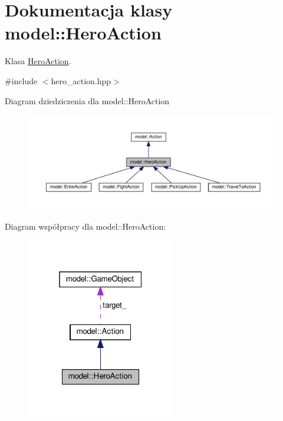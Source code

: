 \hypertarget{classmodel_1_1HeroAction}{}\section{Dokumentacja klasy model\+:\+:Hero\+Action}
\label{classmodel_1_1HeroAction}


Klasa \hyperlink{classmodel_1_1HeroAction}{Hero\+Action}.  




{\ttfamily \#include $<$hero\+\_\+action.\+hpp$>$}



Diagram dziedziczenia dla model\+:\+:Hero\+Action\nopagebreak
\begin{figure}[H]
\begin{center}
\leavevmode
\includegraphics[width=350pt]{classmodel_1_1HeroAction__inherit__graph}
\end{center}
\end{figure}


Diagram współpracy dla model\+:\+:Hero\+Action\+:\nopagebreak
\begin{figure}[H]
\begin{center}
\leavevmode
\includegraphics[width=184pt]{classmodel_1_1HeroAction__coll__graph}
\end{center}
\end{figure}
